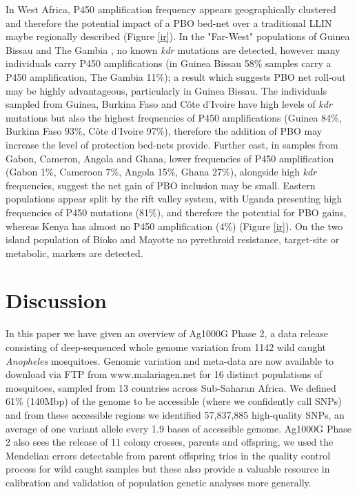 \documentclass[a4paper,11pt,abstracton,hidelinks]{scrartcl}
\begin{document}
In West Africa, P450 amplification frequency appears geographically clustered and therefore the potential impact of a PBO bed-net over a traditional LLIN maybe regionally described (Figure \ref{ir}).
%
In the "Far-West" populations of Guinea Bissau and The Gambia \cite{caputo2011}, no known \textit{kdr} mutations are detected, however many individuals carry P450 amplifications (in Guinea Bissau 58\% samples carry a P450 amplification, The Gambia 11\%); 
%
a result which suggests PBO net roll-out may be highly advantageous, particularly in Guinea Bissau.
%
The individuals sampled from Guinea, Burkina Faso and C\^{o}te d'Ivoire have high levels of \textit{kdr} mutations but also the highest frequencies of P450 amplifications (Guinea 84\%, Burkina Faso 93\%, C\^{o}te d'Ivoire 97\%), therefore the addition of PBO may increase the level of protection bed-nets provide.
%
Further east, in samples from Gabon, Cameron, Angola and Ghana, lower frequencies of P450 amplification (Gabon 1\%, Cameroon 7\%, Angola 15\%, Ghana 27\%), alongside high \textit{kdr} frequencies, suggest the net gain of PBO inclusion may be small.
%
Eastern populations appear split by the rift valley system, with Uganda presenting high frequencies of P450 mutations (81\%), and therefore the potential for PBO gains, whereas Kenya has almost no P450 amplification (4\%) (Figure \ref{ir}).
%
On the two island population of Bioko and Mayotte no pyrethroid resistance, target-site or metabolic, markers are detected.



\section*{Discussion}


In this paper we have given an overview of Ag1000G Phase 2, a data release consisting of deep-sequenced whole genome variation from 1142 wild caught \emph{Anopheles} mosquitoes.
%
Genomic variation and meta-data are now available to download via FTP from www.malariagen.net for 16 distinct populations of mosquitoes, sampled from 13 countries across Sub-Saharan Africa. 
%
We defined 61\% (140Mbp) of the genome to be accessible (where we confidently call SNPs) and from these accessible regions we identified 57,837,885 high-quality SNPs, an average of one variant allele every 1.9 bases of accessible genome.
%
Ag1000G Phase 2 also sees the release of 11 colony crosses, parents and offspring, we used the Mendelian errors detectable from parent offspring trios in the quality control process for wild caught samples but these also provide a valuable resource in calibration and validation of population genetic analyses more generally.
\end{document}
